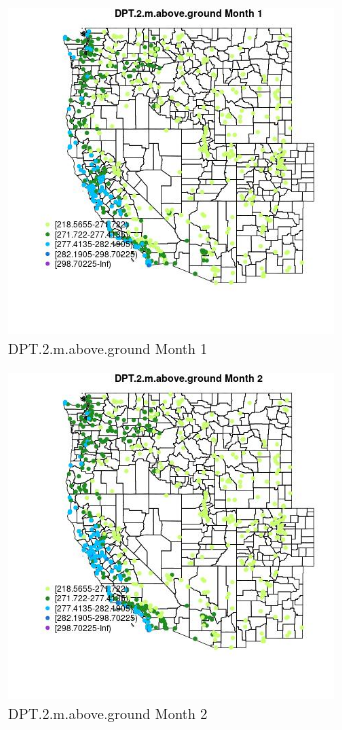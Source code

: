 \begin{figure} 
\centering  
\includegraphics[width=0.77\textwidth]{Code_Outputs/Report_ML_input_PM25_Step4_part_e_de_duplicated_aves_compiled_2019-05-21wNAs_MapObsMo1DPT2maboveground.jpg} 
\caption{\label{fig:Report_ML_input_PM25_Step4_part_e_de_duplicated_aves_compiled_2019-05-21wNAsMapObsMo1DPT2maboveground}DPT.2.m.above.ground Month 1} 
\end{figure} 
 

\begin{figure} 
\centering  
\includegraphics[width=0.77\textwidth]{Code_Outputs/Report_ML_input_PM25_Step4_part_e_de_duplicated_aves_compiled_2019-05-21wNAs_MapObsMo2DPT2maboveground.jpg} 
\caption{\label{fig:Report_ML_input_PM25_Step4_part_e_de_duplicated_aves_compiled_2019-05-21wNAsMapObsMo2DPT2maboveground}DPT.2.m.above.ground Month 2} 
\end{figure} 
 

